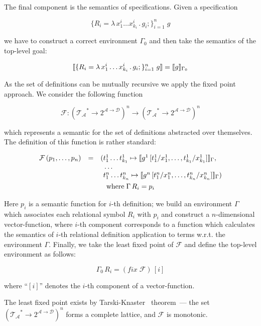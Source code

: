 The final component is the semantics of specifications. Given a specification

\[
\{R_i=\lambda\,x_1^i\dots x_{k_i}^i\,.\,g_i;\}_{i=1}^n\;g
\]

we have to construct a correct environment $\Gamma_0$ and then take the semantics of the top-level goal:

\[
\llbracket{\{R_i=\lambda\,x_1^i\dots x_{k_i}^i\,.\,g_i;\}_{i=1}^n\;g}\rrbracket=\llbracket{g}\rrbracket_{\Gamma_0}
\]

As the set of definitions can be mutually recursive we apply the fixed point approach. We consider the following
function

\[
\mathcal{F} : (\mathcal{T_A}^*\to 2^{\mathcal{A}\to\mathcal{D}})^n\to (\mathcal{T_A}^*\to 2^{\mathcal{A}\to\mathcal{D}})^n
\]

which represents a semantic for the set of definitions abstracted over themselves. The definition of this function is
rather standard:

\begin{gather*}
    \begin{array}{rcl}
      \mathcal{F}\,(p_1,\dots,p_n)& = &(t^1_1\dots t^1_{k_1}\mapsto\llbracket{g^1\,[t^1_1/x^1_1,\dots,t^1_{k_1}/x^1_{k_1}]}\rrbracket_\Gamma,\\
                                  &  &\phantom{(}\dots\\
                                  &  &\phantom{(}t^n_1\dots t^n_{k_n}\mapsto\llbracket{g^n\,[t^n_1/x^n_1,\dots,t^n_{k_n}/x^n_{k_n}]}\rrbracket_\Gamma)
    \end{array}\\
    \mbox{where}\;\Gamma\, R_i=p_i
\end{gather*}

Here $p_i$ is a semantic function for $i$-th definition; we build an environment $\Gamma$ which associates each relational symbol
$R_i$ with $p_i$ and construct a $n$-dimensional vector-function, where $i$-th component corresponds to a function which
calculates the semantics of $i$-th relational definition application to terms w.r.t. the environment $\Gamma$. Finally,
we take the least fixed point of $\mathcal{F}$ and define the top-level environment as follows:

\[
\Gamma_0\,R_i=(fix\;\mathcal{F})\,[i]
\]

where ``$[i]$'' denotes the $i$-th component of a vector-function.

The least fixed point exists by Tarski-Knaster~\cite{TarskiKnaster} theorem~--- the set $(\mathcal{T_A}^*\to 2^{\mathcal{A}\to\mathcal{D}})^n$
forms a complete lattice, and $\mathcal{F}$ is monotonic. 

